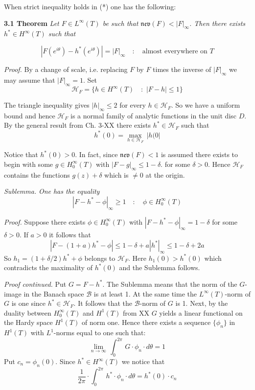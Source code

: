 \documentclass{amsart}
\begin{document}
\noindent
When  strict inequality holds in (*) one has the following:
\medskip

\noindent
{\bf 3.1 Theorem}
\emph{Let $F\in L^\infty(T)$ be such that
$\mathfrak{nev}(F)< |F|_\infty$.
Then there exists  $h^*\in H^\infty(T)$ 
such that}


\[
|F(e^{i\theta})-h^*(e^{i\theta})|=|F|_\infty\quad\colon\quad
\text{almost everywhere on}\,\,T
\]
\medskip

\noindent
\emph{Proof.}
By a change of scale, i.e. replacing $F$ by
$F$ times the inverse of $|F|_\infty$ we may  assume that
$|F|_\infty=1$. Set
\[
\mathcal H_F=\{ h\in H^\infty(T)\quad\colon\,\,
|F-h|\leq 1\}\tag{i}
\]


\noindent
The triangle inequality gives $|h|_\infty\leq 2$ for every
$h\in\mathcal H_F$. So we have a uniform bound and hence
$\mathcal H_F$ is a normal family of analytic functions in
the unit disc $D$.
By the general result from Ch. 3-XX
there exists $h^*\in\mathcal H_F$ such that
\[ 
h^*(0)=\max_{h\in\mathcal H_F}\, |h(0|\tag{ii}
\]
\medskip

\noindent
Notice that $h^*(0)>0$. In fact, since
$\mathfrak{nev}(F)<1$ is assumed there exists to begin with
some $g\in H_0^\infty(T)$ with $|F-g|_\infty\leq 1-\delta$.
for some $\delta>0$. Hence $\mathcal H_F$ contains
the functions $g(z)+\delta$ which is $\neq 0$ at the origin.
\medskip


\noindent
\emph{Sublemma.} \emph{One has the equality}
\[
|F-h^*-\phi|_\infty\geq 1\quad\colon\quad \phi\in H_0^\infty(T)
\]


\noindent
\emph{Proof.}
Suppose there exists 
$\phi\in H_0^\infty(T)$
with $|F-h^*-\phi|_\infty=1-\delta$ for some
$\delta>0$. If $a>0$ it follows that
\[ 
|F-(1+a)h^*-\phi|\leq 1-\delta+a|h^*|_\infty\leq 1-\delta+2a
\]
So $h_1=(1+\delta/2)h^*+\phi$ belongs to $\mathcal H_F$.
Here $h_1(0)>h^*(0)$ which contradicts the maximality of
$h^*(0)$ and the Sublemma follows.




\bigskip


\noindent
\emph{Proof continued.} 
Put $G=F-h^*$.
The Sublemma means that
the norm of the $G$-image in the Banach space
$\mathcal B$ is  at least 1. At the same time the $L^\infty(T)$-norm of
$G$ is one since $h^*\in \mathcal H_F$.
It follows that the 
$\mathcal B$-norm of $G$ is 1.
Next, by the duality between
$H_0^\infty(T)$
and $H^1(T)$ from
 XX
$G$ yields a linear functional on the Hardy space $H^1(T)$ of norm
one. Hence there exists  a sequence $\{\phi_n\}$
in $H^1(T)$ with $L^1$-norms equal to one such that:
\[ 
\lim_{n\to\infty}\, \int_0^{2\pi}\,
G\cdot \phi_n\cdot d\theta=1\tag{1}
\]
Put $c_n=\phi_n(0)$.
Since $h^*\in H^\infty(T)$ we notice that
\[
\frac{1}{2\pi}\cdot \int_0^{2\pi}\,
h^*\cdot \phi_n\cdot d\theta=h^*(0)\cdot c_n\tag{2}
\]
\end{document}
